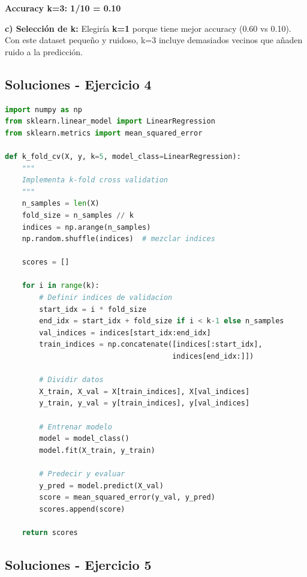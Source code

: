 \documentclass[12pt]{article}
\begin{document}
\textbf{Accuracy k=3: 1/10 = 0.10}

\vspace{1em}

\textbf{c) Selección de k:}
Elegiría \textbf{k=1} porque tiene mejor accuracy (0.60 vs 0.10). Con este dataset pequeño y ruidoso, k=3 incluye demasiados vecinos que añaden ruido a la predicción.

\subsection{Soluciones - Ejercicio 4}

\begin{lstlisting}[language=Python]
import numpy as np
from sklearn.linear_model import LinearRegression
from sklearn.metrics import mean_squared_error

def k_fold_cv(X, y, k=5, model_class=LinearRegression):
    """
    Implementa k-fold cross validation
    """
    n_samples = len(X)
    fold_size = n_samples // k
    indices = np.arange(n_samples)
    np.random.shuffle(indices)  # mezclar indices
    
    scores = []
    
    for i in range(k):
        # Definir indices de validacion
        start_idx = i * fold_size
        end_idx = start_idx + fold_size if i < k-1 else n_samples
        val_indices = indices[start_idx:end_idx]
        train_indices = np.concatenate([indices[:start_idx], 
                                       indices[end_idx:]])
        
        # Dividir datos
        X_train, X_val = X[train_indices], X[val_indices]
        y_train, y_val = y[train_indices], y[val_indices]
        
        # Entrenar modelo
        model = model_class()
        model.fit(X_train, y_train)
        
        # Predecir y evaluar
        y_pred = model.predict(X_val)
        score = mean_squared_error(y_val, y_pred)
        scores.append(score)
    
    return scores
\end{lstlisting}

\subsection{Soluciones - Ejercicio 5}
\end{document}
